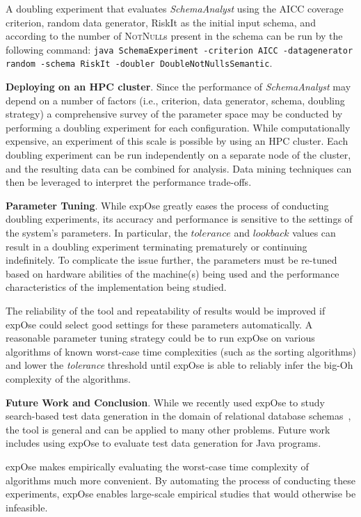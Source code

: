 \documentclass[10pt,twocolumn]{article}
\newcommand{\toolname}{{\sc expOse}\xspace}
\begin{document}
    A doubling experiment that evaluates \textit{SchemaAnalyst} using
    the AICC coverage criterion, random data generator, RiskIt as the initial input
    schema, and according to the number of \textsc{NotNull}s present in the
    schema can be run by the following command:
    \texttt{java SchemaExperiment -criterion AICC -datagenerator random
    -schema RiskIt -doubler DoubleNotNullsSemantic}.

{\bf Deploying on an HPC cluster}.
Since the performance of \textit{SchemaAnalyst} may depend on a number
of factors (i.e., criterion, data generator, schema, doubling strategy) a
comprehensive survey of the parameter space may be conducted by
performing a doubling experiment for each configuration. While
computationally expensive, an experiment of this scale is possible by
using an HPC cluster. Each doubling experiment can be run independently
on a separate node of the cluster, and the resulting data can be combined
for analysis. Data mining techniques can then be leveraged to interpret
the performance trade-offs.


 {\bf Parameter Tuning}.
  While \toolname greatly eases the process of conducting
  doubling experiments, its accuracy and performance is
  sensitive to the settings of the system's parameters.  In particular,
  the $\mathit{tolerance}$ and $\mathit{lookback}$ values can result in
  a doubling experiment terminating prematurely or continuing
  indefinitely.
  To complicate the issue further, the parameters must be re-tuned based
  on hardware abilities of the machine(s) being used and the performance
  characteristics of the implementation being studied.

  The reliability of the tool and repeatability of results would be
  improved if \toolname could select good settings for these
  parameters automatically. A reasonable parameter tuning strategy could
  be to run \toolname on various algorithms of known worst-case
  time complexities (such as the sorting algorithms) and lower the
  \textit{tolerance} threshold until \toolname is able to reliably 
  infer the big-Oh complexity of the algorithms.

{\bf Future Work and Conclusion}.
  While we recently used \toolname to study search-based test data
  generation in the domain of relational database
  schemas~\cite{kinneer2015}, the tool is
  general and can be applied to many other problems. Future work
  includes using \toolname to evaluate test data generation for Java
  programs.


  \toolname makes empirically evaluating the worst-case time
  complexity of algorithms much more convenient. By automating the
  process of conducting these experiments, \toolname enables large-scale
  empirical studies that would otherwise be infeasible.

\setlength{\bibitemsep}{.075in}
{\footnotesize
  
}
\end{document}
